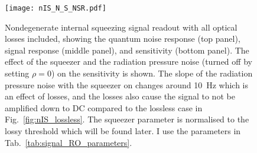 \begin{figure}
	\centering
	\texttt{[image: nIS\_N\_S\_NSR.pdf]}
	\caption{Nondegenerate internal squeezing signal readout with all optical losses included, showing the quantum noise response (top panel), signal response (middle panel), and sensitivity (bottom panel). The effect of the squeezer and the radiation pressure noise (turned off by setting $\rho=0$) on the sensitivity is shown. The slope of the radiation pressure noise with the squeezer on changes around 10~Hz which is an effect of losses, and the losses also cause the signal to not be amplified down to DC compared to the lossless case in Fig.~\ref{fig:nIS_lossless}. The squeezer parameter is normalised to the lossy threshold which will be found later. I use the parameters in Tab.~\ref{tab:signal_RO_parameters}.}
	\label{fig:nIS_general_sens}
\end{figure}

